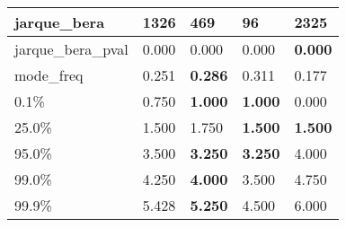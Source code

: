 \begin{table}[H]
\begin{tabular}{|l|m{10em}|m{10em}|m{10em}|m{10em}|}
\hline jarque\_bera & 1326 & \bfseries 469 & \cellcolor[rgb]{0.9, 0.54, 0.52} 96 & 2325 \\
\hline jarque\_bera\_pval & 0.000 & 0.000 & \cellcolor[rgb]{0.9, 0.54, 0.52} 0.000 & \bfseries 0.000 \\
\hline mode\_freq & 0.251 & \bfseries 0.286 & 0.311 & \cellcolor[rgb]{0.9, 0.54, 0.52} 0.177 \\
\hline 0.1\% & 0.750 & \bfseries 1.000 & \bfseries 1.000 & \cellcolor[rgb]{0.9, 0.54, 0.52} 0.000 \\
\hline 25.0\% & 1.500 & \cellcolor[rgb]{0.9, 0.54, 0.52} 1.750 & \bfseries 1.500 & \bfseries 1.500 \\
\hline 95.0\% & 3.500 & \bfseries 3.250 & \bfseries 3.250 & \cellcolor[rgb]{0.9, 0.54, 0.52} 4.000 \\
\hline 99.0\% & 4.250 & \bfseries 4.000 & \cellcolor[rgb]{0.9, 0.54, 0.52} 3.500 & 4.750 \\
\hline 99.9\% & 5.428 & \bfseries 5.250 & \cellcolor[rgb]{0.9, 0.54, 0.52} 4.500 & 6.000 \\
\hline
\end{tabular}
\end{table}
